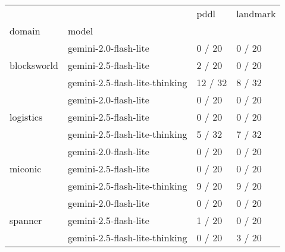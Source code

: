 \begin{tabular}{llll}
\toprule
 &  & pddl & landmark \\
domain & model &  &  \\
\midrule
\multirow[t]{3}{*}{blocksworld} & gemini-2.0-flash-lite & 0 / 20 & 0 / 20 \\
 & gemini-2.5-flash-lite & 2 / 20 & 0 / 20 \\
 & gemini-2.5-flash-lite-thinking & 12 / 32 & 8 / 32 \\
\cline{1-4}
\multirow[t]{3}{*}{logistics} & gemini-2.0-flash-lite & 0 / 20 & 0 / 20 \\
 & gemini-2.5-flash-lite & 0 / 20 & 0 / 20 \\
 & gemini-2.5-flash-lite-thinking & 5 / 32 & 7 / 32 \\
\cline{1-4}
\multirow[t]{3}{*}{miconic} & gemini-2.0-flash-lite & 0 / 20 & 0 / 20 \\
 & gemini-2.5-flash-lite & 0 / 20 & 0 / 20 \\
 & gemini-2.5-flash-lite-thinking & 9 / 20 & 9 / 20 \\
\cline{1-4}
\multirow[t]{3}{*}{spanner} & gemini-2.0-flash-lite & 0 / 20 & 0 / 20 \\
 & gemini-2.5-flash-lite & 1 / 20 & 0 / 20 \\
 & gemini-2.5-flash-lite-thinking & 0 / 20 & 3 / 20 \\
\cline{1-4}
\end{tabular}